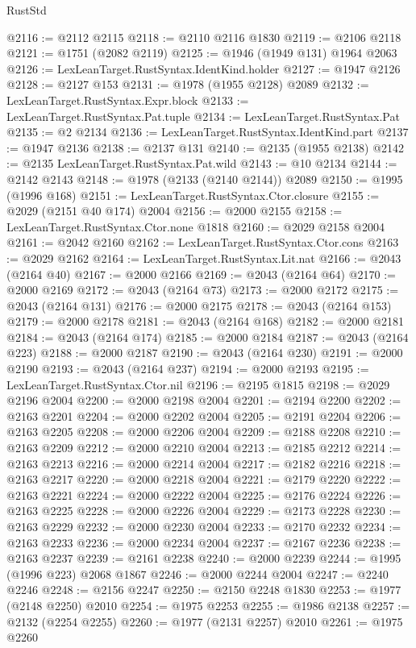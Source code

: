 \begin{lexlean}{RustStd}
\begin{coremodule}
{\begin{coremodule}
{{{{{{{{{{{{{{{{{{{{{{{{{{{{{{{@2116 := @2112 @2115
@2118 := @2110 @2116 @1830
@2119 := @2106 @2118
@2121 := @1751 (@2082 @2119)
@2125 := @1946 (@1949 @131) @1964 @2063
@2126 := LexLeanTarget.RustSyntax.IdentKind.holder
@2127 := @1947 @2126
@2128 := @2127 @153
@2131 := @1978 (@1955 @2128) @2089
@2132 := LexLeanTarget.RustSyntax.Expr.block
@2133 := LexLeanTarget.RustSyntax.Pat.tuple
@2134 := LexLeanTarget.RustSyntax.Pat
@2135 := @2 @2134
@2136 := LexLeanTarget.RustSyntax.IdentKind.part
@2137 := @1947 @2136
@2138 := @2137 @131
@2140 := @2135 (@1955 @2138)
@2142 := @2135 LexLeanTarget.RustSyntax.Pat.wild
@2143 := @10 @2134
@2144 := @2142 @2143
@2148 := @1978 (@2133 (@2140 @2144)) @2089
@2150 := @1995 (@1996 @168)
@2151 := LexLeanTarget.RustSyntax.Ctor.closure
@2155 := @2029 (@2151 @40 @174) @2004
@2156 := @2000 @2155
@2158 := LexLeanTarget.RustSyntax.Ctor.none @1818
@2160 := @2029 @2158 @2004
@2161 := @2042 @2160
@2162 := LexLeanTarget.RustSyntax.Ctor.cons
@2163 := @2029 @2162
@2164 := LexLeanTarget.RustSyntax.Lit.nat
@2166 := @2043 (@2164 @40)
@2167 := @2000 @2166
@2169 := @2043 (@2164 @64)
@2170 := @2000 @2169
@2172 := @2043 (@2164 @73)
@2173 := @2000 @2172
@2175 := @2043 (@2164 @131)
@2176 := @2000 @2175
@2178 := @2043 (@2164 @153)
@2179 := @2000 @2178
@2181 := @2043 (@2164 @168)
@2182 := @2000 @2181
@2184 := @2043 (@2164 @174)
@2185 := @2000 @2184
@2187 := @2043 (@2164 @223)
@2188 := @2000 @2187
@2190 := @2043 (@2164 @230)
@2191 := @2000 @2190
@2193 := @2043 (@2164 @237)
@2194 := @2000 @2193
@2195 := LexLeanTarget.RustSyntax.Ctor.nil
@2196 := @2195 @1815
@2198 := @2029 @2196 @2004
@2200 := @2000 @2198 @2004
@2201 := @2194 @2200
@2202 := @2163 @2201
@2204 := @2000 @2202 @2004
@2205 := @2191 @2204
@2206 := @2163 @2205
@2208 := @2000 @2206 @2004
@2209 := @2188 @2208
@2210 := @2163 @2209
@2212 := @2000 @2210 @2004
@2213 := @2185 @2212
@2214 := @2163 @2213
@2216 := @2000 @2214 @2004
@2217 := @2182 @2216
@2218 := @2163 @2217
@2220 := @2000 @2218 @2004
@2221 := @2179 @2220
@2222 := @2163 @2221
@2224 := @2000 @2222 @2004
@2225 := @2176 @2224
@2226 := @2163 @2225
@2228 := @2000 @2226 @2004
@2229 := @2173 @2228
@2230 := @2163 @2229
@2232 := @2000 @2230 @2004
@2233 := @2170 @2232
@2234 := @2163 @2233
@2236 := @2000 @2234 @2004
@2237 := @2167 @2236
@2238 := @2163 @2237
@2239 := @2161 @2238
@2240 := @2000 @2239
@2244 := @1995 (@1996 @223) @2068 @1867
@2246 := @2000 @2244 @2004
@2247 := @2240 @2246
@2248 := @2156 @2247
@2250 := @2150 @2248 @1830
@2253 := @1977 (@2148 @2250) @2010
@2254 := @1975 @2253
@2255 := @1986 @2138
@2257 := @2132 (@2254 @2255)
@2260 := @1977 (@2131 @2257) @2010
@2261 := @1975 @2260
}}}}}}}}}}}}}}}}}}}}}}}}}}}}}}}
\end{coremodule}}
\end{coremodule}
\end{lexlean}
